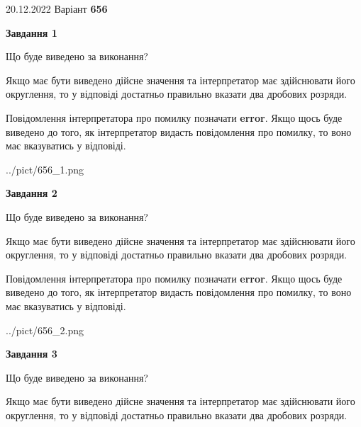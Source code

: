 \documentclass[12pt, ukrainian]{article}
\begin{document}
{20.12.2022 Варіант \No \textbf { 656 }\par}
{
\begin {Large}

{\begin {center}\textbf{Завдання 1}\end {center}}\par
Що буде виведено за виконання? \par

Якщо має бути виведено дійсне значення та інтерпретатор має здійснювати його округлення, 
то у відповіді достатньо правильно вказати два дробових розряди.

Повідомлення інтерпретатора про помилку позначати \textbf{error}.
Якщо щось буде виведено до того, як інтерпретатор видасть повідомлення про помилку, 
то воно має вказуватись у відповіді. \par

\begin{center}
	{../pict/656_1.png}
\end{center}
\newpage

{\begin {center}\textbf{Завдання 2}\end {center}}\par
Що буде виведено за виконання? \par

Якщо має бути виведено дійсне значення та інтерпретатор має здійснювати його округлення, 
то у відповіді достатньо правильно вказати два дробових розряди.

Повідомлення інтерпретатора про помилку позначати \textbf{error}.
Якщо щось буде виведено до того, як інтерпретатор видасть повідомлення про помилку, 
то воно має вказуватись у відповіді. \par

\begin{center}
	{../pict/656_2.png}
\end{center}
\newpage

{\begin {center}\textbf{Завдання 3}\end {center}}\par
Що буде виведено за виконання? \par

Якщо має бути виведено дійсне значення та інтерпретатор має здійснювати його округлення, 
то у відповіді достатньо правильно вказати два дробових розряди.


\end{Large}}
\end{document}
